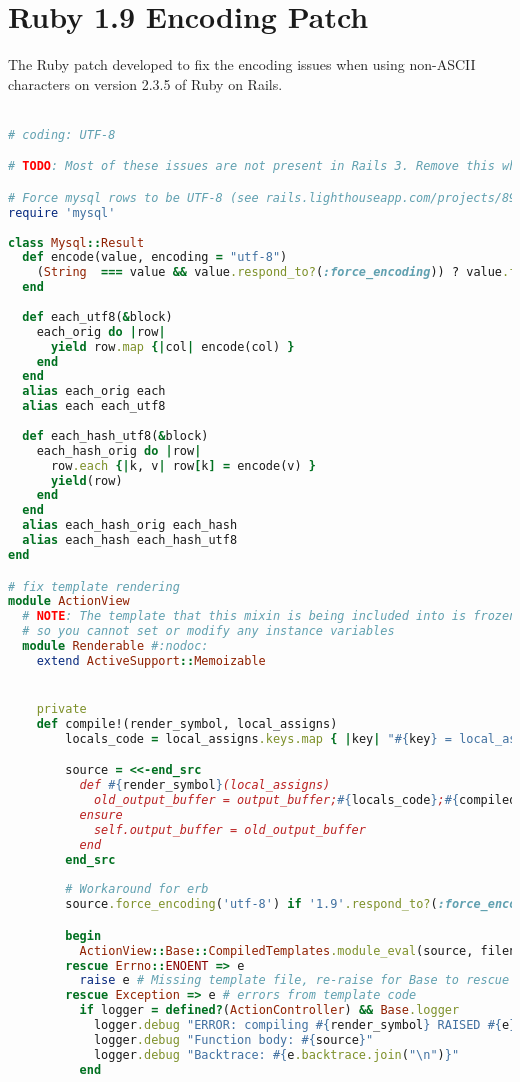 \chapter{Ruby 1.9 Encoding Patch} %
\label{ap:ruby19_encoding_patch}

The Ruby patch developed to fix the encoding issues when using non-ASCII characters on version 2.3.5 of Ruby on Rails.\\\\

\begin{lstlisting}[language=ruby]
# coding: UTF-8

# TODO: Most of these issues are not present in Rails 3. Remove this when updating.

# Force mysql rows to be UTF-8 (see rails.lighthouseapp.com/projects/8994/tickets/2476)
require 'mysql'
 
class Mysql::Result
  def encode(value, encoding = "utf-8")
    (String  === value && value.respond_to?(:force_encoding)) ? value.force_encoding(encoding) : value
  end
  
  def each_utf8(&block)
    each_orig do |row|
      yield row.map {|col| encode(col) }
    end
  end
  alias each_orig each
  alias each each_utf8
 
  def each_hash_utf8(&block)
    each_hash_orig do |row|
      row.each {|k, v| row[k] = encode(v) }
      yield(row)
    end
  end
  alias each_hash_orig each_hash
  alias each_hash each_hash_utf8
end

# fix template rendering
module ActionView
  # NOTE: The template that this mixin is being included into is frozen
  # so you cannot set or modify any instance variables
  module Renderable #:nodoc:
    extend ActiveSupport::Memoizable


    private    
    def compile!(render_symbol, local_assigns)
        locals_code = local_assigns.keys.map { |key| "#{key} = local_assigns[:#{key}];" }.join

        source = <<-end_src
          def #{render_symbol}(local_assigns)
            old_output_buffer = output_buffer;#{locals_code};#{compiled_source}
          ensure
            self.output_buffer = old_output_buffer
          end
        end_src
        
        # Workaround for erb
        source.force_encoding('utf-8') if '1.9'.respond_to?(:force_encoding)

        begin
          ActionView::Base::CompiledTemplates.module_eval(source, filename, 0)
        rescue Errno::ENOENT => e
          raise e # Missing template file, re-raise for Base to rescue
        rescue Exception => e # errors from template code
          if logger = defined?(ActionController) && Base.logger
            logger.debug "ERROR: compiling #{render_symbol} RAISED #{e}"
            logger.debug "Function body: #{source}"
            logger.debug "Backtrace: #{e.backtrace.join("\n")}"
          end


\end{lstlisting}
